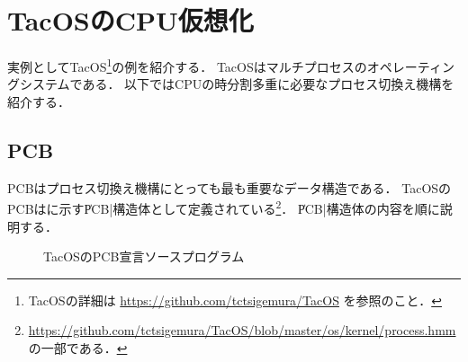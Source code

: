 \section{TacOSのCPU仮想化}
実例としてTacOS\footnote{TacOSの詳細は
\url{https://github.com/tctsigemura/TacOS}
を参照のこと．}の例を紹介する．
TacOSはマルチプロセスのオペレーティングシステムである．
以下ではCPUの時分割多重に必要なプロセス切換え機構を紹介する．

\subsection{PCB}
PCBはプロセス切換え機構にとっても最も重要なデータ構造である．
TacOSのPCBはに示す\|PCB|構造体として定義されている\footnote{
\url{https://github.com/tctsigemura/TacOS/blob/master/os/kernel/process.hmm}
の一部である．}．
\|PCB|構造体の内容を順に説明する．

\begin{figure}[btp]

\caption{TacOSのPCB宣言ソースプログラム}
\label{fig:tacosPCB}
\end{figure}

